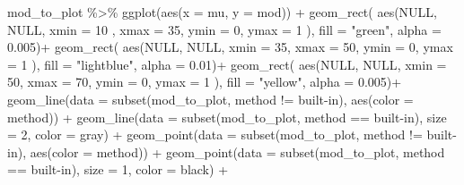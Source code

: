 \documentclass[
]{article}
\newenvironment{Shaded}{\begin{snugshade}}{\end{snugshade}}
\newcommand{\AttributeTok}[1]{\textcolor[rgb]{0.77,0.63,0.00}{#1}}
\newcommand{\ConstantTok}[1]{\textcolor[rgb]{0.00,0.00,0.00}{#1}}
\newcommand{\DecValTok}[1]{\textcolor[rgb]{0.00,0.00,0.81}{#1}}
\newcommand{\FloatTok}[1]{\textcolor[rgb]{0.00,0.00,0.81}{#1}}
\newcommand{\FunctionTok}[1]{\textcolor[rgb]{0.00,0.00,0.00}{#1}}
\newcommand{\NormalTok}[1]{#1}
\newcommand{\SpecialCharTok}[1]{\textcolor[rgb]{0.00,0.00,0.00}{#1}}
\newcommand{\StringTok}[1]{\textcolor[rgb]{0.31,0.60,0.02}{#1}}
\begin{document}
\begin{Shaded}
\begin{Highlighting}[]
\NormalTok{mod\_to\_plot }\SpecialCharTok{\%\textgreater{}\%}
  \FunctionTok{ggplot}\NormalTok{(}\FunctionTok{aes}\NormalTok{(}\AttributeTok{x =}\NormalTok{ mu, }\AttributeTok{y =}\NormalTok{ mod)) }\SpecialCharTok{+}
  \FunctionTok{geom\_rect}\NormalTok{( }\FunctionTok{aes}\NormalTok{(}\ConstantTok{NULL}\NormalTok{, }\ConstantTok{NULL}\NormalTok{, }\AttributeTok{xmin =} \DecValTok{10}\NormalTok{ , }\AttributeTok{xmax =} \DecValTok{35}\NormalTok{, }\AttributeTok{ymin =} \DecValTok{0}\NormalTok{, }\AttributeTok{ymax =} \DecValTok{1}\NormalTok{ ), }\AttributeTok{fill =} \StringTok{"green"}\NormalTok{, }\AttributeTok{alpha =} \FloatTok{0.005}\NormalTok{)}\SpecialCharTok{+}
  \FunctionTok{geom\_rect}\NormalTok{( }\FunctionTok{aes}\NormalTok{(}\ConstantTok{NULL}\NormalTok{, }\ConstantTok{NULL}\NormalTok{, }\AttributeTok{xmin =} \DecValTok{35}\NormalTok{, }\AttributeTok{xmax =} \DecValTok{50}\NormalTok{, }\AttributeTok{ymin =} \DecValTok{0}\NormalTok{, }\AttributeTok{ymax =} \DecValTok{1}\NormalTok{ ), }\AttributeTok{fill =} \StringTok{"lightblue"}\NormalTok{, }\AttributeTok{alpha =} \FloatTok{0.01}\NormalTok{)}\SpecialCharTok{+}
  \FunctionTok{geom\_rect}\NormalTok{( }\FunctionTok{aes}\NormalTok{(}\ConstantTok{NULL}\NormalTok{, }\ConstantTok{NULL}\NormalTok{, }\AttributeTok{xmin =} \DecValTok{50}\NormalTok{, }\AttributeTok{xmax =} \DecValTok{70}\NormalTok{, }\AttributeTok{ymin =} \DecValTok{0}\NormalTok{, }\AttributeTok{ymax =} \DecValTok{1}\NormalTok{ ), }\AttributeTok{fill =} \StringTok{"yellow"}\NormalTok{, }\AttributeTok{alpha =} \FloatTok{0.005}\NormalTok{)}\SpecialCharTok{+}
  \FunctionTok{geom\_line}\NormalTok{(}\AttributeTok{data =} \FunctionTok{subset}\NormalTok{(mod\_to\_plot, method }\SpecialCharTok{!=} \StringTok{\textquotesingle{}built{-}in\textquotesingle{}}\NormalTok{), }\FunctionTok{aes}\NormalTok{(}\AttributeTok{color =}\NormalTok{ method)) }\SpecialCharTok{+}
  \FunctionTok{geom\_line}\NormalTok{(}\AttributeTok{data =} \FunctionTok{subset}\NormalTok{(mod\_to\_plot, method }\SpecialCharTok{==} \StringTok{\textquotesingle{}built{-}in\textquotesingle{}}\NormalTok{), }\AttributeTok{size =} \DecValTok{2}\NormalTok{, }\AttributeTok{color =} \StringTok{\textquotesingle{}gray\textquotesingle{}}\NormalTok{) }\SpecialCharTok{+}
  \FunctionTok{geom\_point}\NormalTok{(}\AttributeTok{data =} \FunctionTok{subset}\NormalTok{(mod\_to\_plot, method }\SpecialCharTok{!=} \StringTok{\textquotesingle{}built{-}in\textquotesingle{}}\NormalTok{), }\FunctionTok{aes}\NormalTok{(}\AttributeTok{color =}\NormalTok{ method)) }\SpecialCharTok{+}
  \FunctionTok{geom\_point}\NormalTok{(}\AttributeTok{data =} \FunctionTok{subset}\NormalTok{(mod\_to\_plot, method }\SpecialCharTok{==} \StringTok{\textquotesingle{}built{-}in\textquotesingle{}}\NormalTok{), }\AttributeTok{size =} \DecValTok{1}\NormalTok{, }\AttributeTok{color =} \StringTok{\textquotesingle{}black\textquotesingle{}}\NormalTok{) }\SpecialCharTok{+}
  

\end{Highlighting}
\end{Shaded}
\end{document}
